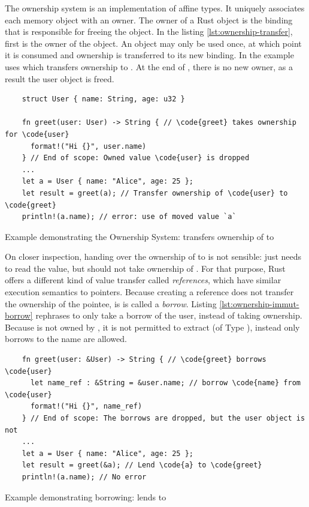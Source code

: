 \documentclass[twoside, english, final]{sdqthesis}
\theoremstyle{definition}
\begin{document}
The ownership system is an implementation of affine types. It uniquely associates each memory object with an owner. 
The owner of a Rust object is the binding that is responsible for freeing the object. In the listing \ref{lst:ownership-transfer}, first  is the owner of the  object. An object may only be used once, at which point it is consumed and ownership is transferred to its new binding. In the example  uses  which transfers ownership to . At the end of , there is no new owner, as a result the user object is freed.

\begin{listing}[h]
  \begin{verbatim}
    struct User { name: String, age: u32 }

    fn greet(user: User) -> String { // \code{greet} takes ownership for \code{user}
      format!("Hi {}", user.name)
    } // End of scope: Owned value \code{user} is dropped
    ...
    let a = User { name: "Alice", age: 25 };
    let result = greet(a); // Transfer ownership of \code{user} to \code{greet}
    println!(a.name); // error: use of moved value `a`
  \end{verbatim}
  \caption{Example demonstrating the Ownership System:  transfers ownership of  to }
  \label{lst:ownership-transfer}
\end{listing}

On closer inspection, handing over the ownership of  to  is not sensible:  just needs to read the value, but should not take ownership of . 
For that purpose, Rust offers a different kind of value transfer called \textit{references}, which have similar execution semantics to pointers. Because creating a reference does not transfer the ownership of the pointee, is is called a \textit{borrow}. Listing \ref{lst:ownership-immut-borrow} rephrases  to only take a borrow of the user, instead of taking ownership. Because  is not owned by , it is not permitted to extract  (of Type ), instead only borrows to the name are allowed. 

\begin{listing}[h]
  \begin{verbatim}
    fn greet(user: &User) -> String { // \code{greet} borrows \code{user}
      let name_ref : &String = &user.name; // borrow \code{name} from \code{user}
      format!("Hi {}", name_ref)
    } // End of scope: The borrows are dropped, but the user object is not
    ...
    let a = User { name: "Alice", age: 25 };
    let result = greet(&a); // Lend \code{a} to \code{greet}
    println!(a.name); // No error
  \end{verbatim}
  \caption{Example demonstrating borrowing:  lends  to }
  \label{lst:ownership-immut-borrow}
\end{listing}
\end{document}
